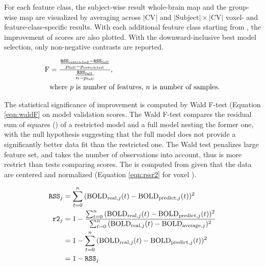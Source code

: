 For each feature class, the subject-wise result whole-brain map and the group-wise map are visualized by averaging across \(\lvert \text{CV} \rvert \) and \( \lvert \text{Subject} \rvert \times \lvert \text{CV} \rvert \) voxel- and feature-class-specific results. With each additional feature class starting from , the improvement of  scores are also plotted. With the downward-inclusive best model selection, only non-negative contrasts are reported. 
 
\begin{equation}
    \begin{split}
    \text{F} &= \frac{\frac{\texttt{RSS}_{\text{restricted}}-\texttt{RSS}_{\text{full}}}{p_{\text{full}}-p_{\text{restricted}}}}{\frac{\texttt{RSS}_{\text{full}}}{n-p_{\text{full}}}}, \\
    &\text{where } p\text{ is number of features, }n\text{ is number of samples.}
    \end{split}
\label{eqn:waldF}
    \end{equation}

The statistical significance of improvement is computed by Wald F-test (Equation \ref{eqn:waldF} on model validation scores. The Wald F-test compares the residual sum of squares () of a restricted model and a full model nesting the former one, with the null hypothesis suggesting that the full model does not provide a significantly better data fit than the restricted one. The Wald test penalizes large feature set, and takes the number of observations into account, thus is more restrict than tests comparing  scores. The  is computed from  given that the data are centered and normalized (Equation \ref{eqn:rssr2} for voxel ).


\begin{equation}
    \begin{split}
         \texttt{RSS}_j &= \sum_{t=0}^{n} {(\text{BOLD}_{\text{real}, j}(t) - \text{BOLD}_{\text{predict}, j}(t))^2} \\
         \texttt{r2}_j &= 1 - \frac{\sum_{t=0}^{n}{(\text{BOLD}_{\text{real}, j}(t) - \text{BOLD}_{\text{predict}, j}(t))^2}}{\sum_{t=0}^{n}{(\text{BOLD}_{\text{real}, j}(t) - \text{BOLD}_{\text{average}, j})^2}} \\
         &= 1 - \sum_{t=0}^{n}{(\text{BOLD}_{\text{real}, j}(t) - \text{BOLD}_{\text{predict}, j}(t))^2} \\
         &= 1- \texttt{RSS}_j
        \end{split}
\label{eqn:rssr2}
    \end{equation}

